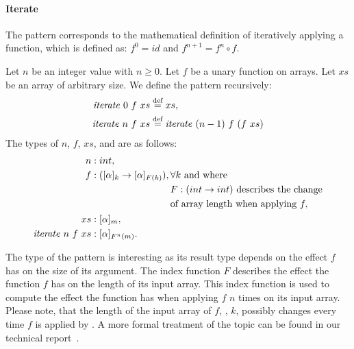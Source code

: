 

\paragraph{Iterate}
The \iterateN pattern corresponds to the mathematical definition of iteratively applying a function, which is defined as: {$f^0 = id$} and {$f^{n+1} = f^n \circ f$}.

\begin{definition}
  \label{definition:pattern:iterate}
  Let $n$ be an integer value with $n \geq 0$.
  Let $f$ be a unary function on arrays.
  Let $xs$ be an array of arbitrary size.
  We define the \iterateN pattern recursively:
  \begin{align*}
    \text{\textit{iterate}}\ 0\ f\ xs &\stackrel{\textrm{\scriptsize def}}{=} xs,\\
    \text{\textit{iterate}}\ n\ f\ xs &\stackrel{\textrm{\scriptsize def}}{=} \text{\textit{iterate}}\ (n-1)\ f\ (f\ xs)
  \end{align*}
  The types of $n$, $f$, $xs$, and \iterateN are as follows:
  \begin{align*}
    n &: int,\\
    f &: ([\alpha]_k \rightarrow [\alpha]_{F(k)}),
      \begin{aligned}[t]
        & \forall k \text{ and where } \\
        &F : (int\rightarrow int) \text{ describes the change}\\
        &\text{of array length when applying } f,
      \end{aligned}\\
    xs &: [\alpha]_m,\\
    \text{\textit{iterate}}\ n\ f\ xs &: [\alpha]_{F^n(m)} .
  \end{align*}
\end{definition}


\noindent
The type of the \iterateN pattern is interesting as its result type depends on the effect $f$ has on the size of its argument.
The index function $F$ describes the effect the function $f$ has on the length of its input array.
This index function is used to compute the effect the \iterateN function has when applying $f$ $n$ times on its input array.
Please note, that the length of the input array of $f$, \ie, $k$, possibly changes every time $f$ is applied by \iterateN.
A more formal treatment of the topic can be found in our technical report~\cite{SteuwerFeLiDu2015}.

